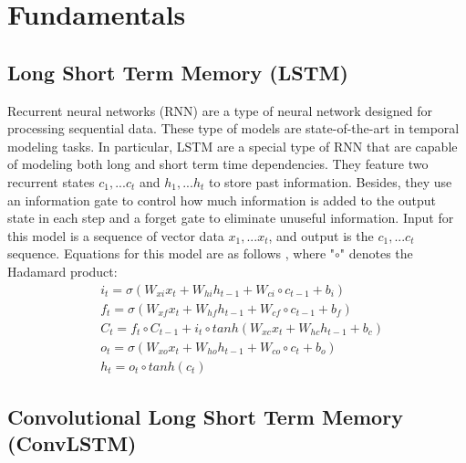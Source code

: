 

\section{Fundamentals}

\subsection{Long Short Term Memory (LSTM)}

Recurrent neural networks (RNN) are a type of neural network designed for processing sequential data. These type of models are state-of-the-art in temporal modeling tasks\cite{ma2017ts}. In particular, LSTM are a special type of RNN that are capable of modeling both long and short term time dependencies. They feature two recurrent states $c_1,...c_t$ and $h_1,...h_t$ to store past information. Besides, they use an information gate to control how much information is added to the output state in each step and a forget gate to eliminate unuseful information. Input for this model is a sequence of vector data $x_1,...x_t$, and output is the $c_1,...c_t$ sequence. Equations for this model are as follows \cite{convlstm}, where "$\circ$" denotes the Hadamard product:
\begin{align*}
& i_t=\sigma (W_{xi}x_t+W_{hi} h_{t-1} + W_{ci}\circ c_{t-1}+b_i) \\
& f_t=\sigma (W_{xf} x_t+W_{hf} h_{t-1} + W_{cf}\circ c_{t-1}+b_f) \\
& C_t=f_t\circ C_{t-1}+i_t\circ tanh(W_{xc} x_t+W_{hc} h_{t-1}+b_c) \\
& o_t=\sigma (W_{xo} x_t+W_{ho} h_{t-1} + W_{co} \circ c_{t}+b_o) \\
& h_t=o_t\circ tanh(c_t)
\end{align*}

\subsection{Convolutional Long Short Term Memory (ConvLSTM)}

